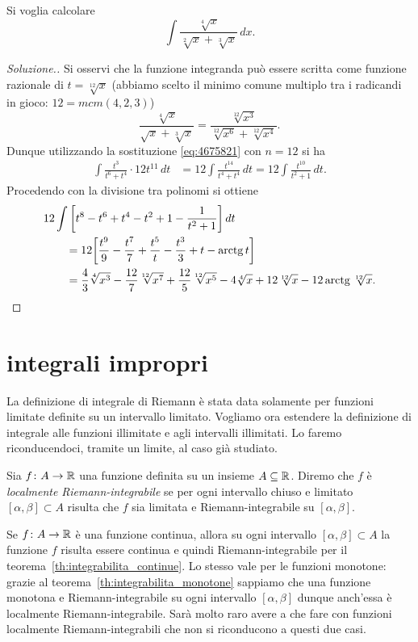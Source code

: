 \begin{example}
Si voglia calcolare
\[
  \int \frac{\sqrt[4]{x}}{\sqrt[2]{x} + \sqrt[3]{x}}\, dx.
\]
\end{example}
\begin{proof}[Soluzione.]
Si osservi che la funzione integranda può essere scritta
come funzione razionale di $t=\sqrt[12]{x}$ (abbiamo scelto
il minimo comune multiplo tra i radicandi in gioco: $12 = mcm(4,2,3)$)
\[
  \frac{\sqrt[4]{x}}{\sqrt{x} + \sqrt[3]{x}}
  = \frac{\sqrt[12]{x^3}}{\sqrt[12]{x^6} + \sqrt[12]{x^4}}.
\]
Dunque utilizzando la sostituzione \eqref{eq:4675821} con $n=12$ si ha
\begin{align*}
\int \frac{t^3}{t^6 + t^4}\cdot 12 t^{11}\, dt
&= 12 \int \frac{t^{14}}{t^4+t^4}\, dt
 = 12 \int \frac{t^{10}}{t^2+1}\, dt.
\end{align*}
Procedendo con la divisione tra polinomi si ottiene
\begin{align*}
\MoveEqLeft{12 \int \Enclose{t^8 - t^6 + t^4 - t^2 + 1 - \frac{1}{t^2+1}}\, dt} \\
&= 12 \Enclose{\frac{t^9}{9} - \frac{t^7}{7} + \frac{t^5}{t} - \frac{t^3}{3} + t - \arctg t} \\
&= \frac 4 3 \sqrt[4]{x^3} - \frac{12}{7}\sqrt[12]{x^7}
+ \frac{12}{5}\sqrt[12]{x^5} - 4 \sqrt[4]{x} + 12 \sqrt[12]{x} - 12 \arctg \sqrt[12]{x}.
\end{align*}
\end{proof}

\section{integrali impropri}

La definizione di integrale di Riemann è stata data solamente per funzioni
limitate definite su un intervallo
limitato.
Vogliamo ora estendere la definizione di integrale alle funzioni illimitate e
agli intervalli illimitati.
Lo faremo riconducendoci, tramite un limite, al caso già studiato.

\begin{definition}
\label{def:localmente_riemann}
Sia $f\colon A \to \mathbb R$ una funzione definita su un insieme $A\subseteq \mathbb R$.
Diremo che $f$ è \emph{localmente Riemann-integrabile} se
per ogni intervallo chiuso e limitato $[\alpha,\beta]\subset A$ risulta
che $f$ sia limitata e Riemann-integrabile su $[\alpha,\beta]$.
\end{definition}

\begin{remark}
Se $f\colon A \to \mathbb R$ è una funzione continua, allora su ogni
intervallo $[\alpha,\beta]\subset A$ la funzione $f$ risulta essere continua
e quindi Riemann-integrabile per il teorema~\ref{th:integrabilita_continue}.
Lo stesso vale per le funzioni monotone: grazie al teorema~\ref{th:integrabilita_monotone}
sappiamo che una funzione monotona e
Riemann-integrabile su ogni intervallo $[\alpha,\beta]$ dunque anch'essa
è localmente Riemann-integrabile. Sarà molto raro avere a che fare con
funzioni localmente Riemann-integrabili che non si riconducono
a questi due casi.
\end{remark}

